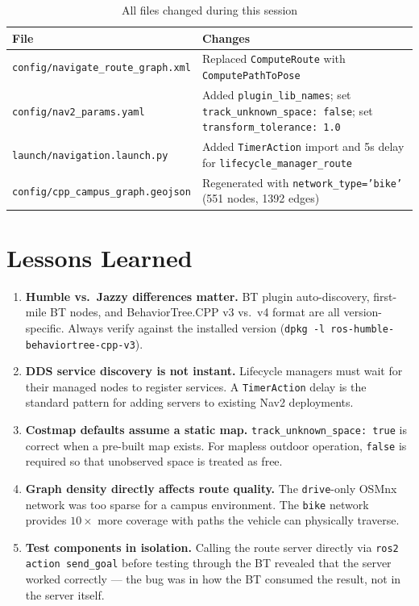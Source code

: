 \documentclass[11pt,a4paper]{article}
\begin{document}
\begin{table}[h]
\centering
\caption{All files changed during this session}
\begin{tabular}{lp{8cm}}
\toprule
\textbf{File} & \textbf{Changes} \\
\midrule
\texttt{config/navigate\_route\_graph.xml} & Replaced \texttt{ComputeRoute} with \texttt{ComputePathToPose} \\
\texttt{config/nav2\_params.yaml} & Added \texttt{plugin\_lib\_names}; set \texttt{track\_unknown\_space: false}; set \texttt{transform\_tolerance: 1.0} \\
\texttt{launch/navigation.launch.py} & Added \texttt{TimerAction} import and 5s delay for \texttt{lifecycle\_manager\_route} \\
\texttt{config/cpp\_campus\_graph.geojson} & Regenerated with \texttt{network\_type='bike'} (551 nodes, 1392 edges) \\
\bottomrule
\end{tabular}
\end{table}

\section{Lessons Learned}

\begin{enumerate}
    \item \textbf{Humble vs.\ Jazzy differences matter.} BT plugin auto-discovery, first-mile BT nodes, and BehaviorTree.CPP v3 vs.\ v4 format are all version-specific. Always verify against the installed version (\texttt{dpkg -l ros-humble-behaviortree-cpp-v3}).

    \item \textbf{DDS service discovery is not instant.} Lifecycle managers must wait for their managed nodes to register services. A \texttt{TimerAction} delay is the standard pattern for adding servers to existing Nav2 deployments.

    \item \textbf{Costmap defaults assume a static map.} \texttt{track\_unknown\_space: true} is correct when a pre-built map exists. For mapless outdoor operation, \texttt{false} is required so that unobserved space is treated as free.

    \item \textbf{Graph density directly affects route quality.} The \texttt{drive}-only OSMnx network was too sparse for a campus environment. The \texttt{bike} network provides $10\times$ more coverage with paths the vehicle can physically traverse.

    \item \textbf{Test components in isolation.} Calling the route server directly via \texttt{ros2 action send\_goal} before testing through the BT revealed that the server worked correctly --- the bug was in how the BT consumed the result, not in the server itself.
\end{enumerate}
\end{document}
